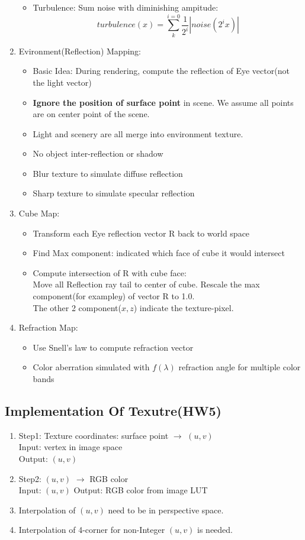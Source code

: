 \documentclass[geye,cyan,normal,en]{elegantnote}
\begin{document}
\begin{enumerate}
\begin{itemize}
		\item Turbulence: Sum noise with diminishing ampitude:
		$$turbulence(x)=\sum_{k}^{i=0} \frac{1}{2^i}|noise(2^i x)|$$
	\end{itemize}
	\item Evironment(Reflection) Mapping:
	\begin{itemize}
		\item Basic Idea: During rendering, compute the reflection of Eye vector(not the light vector)
		\item \textbf{Ignore the position of surface point} in scene. We assume all points are on center point of the scene.
		\item Light and scenery are all merge into environment texture.
		\item No object inter-reflection or shadow
		\item Blur texture to simulate diffuse reflection
		\item Sharp texture to simulate specular reflection
	\end{itemize}
	\item Cube Map:
	\begin{itemize}
		\item Transform each Eye reflection vector R back to world space
		\item Find Max component: indicated which face of cube it would intersect
		\item Compute intersection of R with cube face:\\
		Move all Reflection ray tail to center of cube.
		Rescale the max component(for example$y$) of vector R to 1.0.\\
		The other 2 component($x,z$) indicate the texture-pixel.
	\end{itemize}
	\item Refraction Map:
	\begin{itemize}
		\item Use Snell's law to compute refraction vector
		\item Color aberration simulated with $f(\lambda)$ refraction angle for multiple color bands
	\end{itemize}
\end{enumerate}
\subsection{Implementation Of Texutre(HW5)}
\begin{enumerate}
	\item Step1: Texture coordinates: surface point $\rightarrow$ $(u,v)$\\
	Input: vertex in image space\\
	Output: $(u,v)$
	\item Step2: $(u,v)$ $\rightarrow$ RGB color\\
	Input: $(u,v)$
	Output: RGB color from image LUT
	\item Interpolation of $(u,v)$ need to be in perspective space.
	\item Interpolation of 4-corner for non-Integer $(u,v)$ is needed.
\end{enumerate}
\newpage
\end{document}
